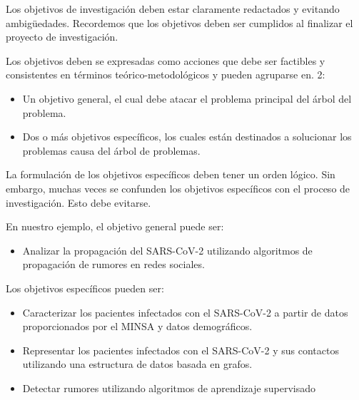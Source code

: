 Los objetivos de investigación deben estar claramente redactados y evitando ambigüedades. Recordemos que los objetivos deben ser cumplidos al finalizar el proyecto de investigación.

Los objetivos deben se expresadas como acciones que debe ser factibles y consistentes en términos teórico-metodológicos y pueden agruparse en. 2:

\begin{itemize}
\item Un objetivo general, el cual debe atacar el problema principal del árbol del problema.
\item Dos o más objetivos específicos, los cuales están destinados a solucionar los problemas causa del árbol de problemas.
\end{itemize}

La formulación de los objetivos específicos deben tener un orden lógico. Sin embargo, muchas veces se confunden los objetivos específicos con el proceso de investigación. Esto debe evitarse.\\

\begin{tcolorbox}[colback=blue!5!white,colframe=blue!75!black,title=Ejemplo]
En nuestro ejemplo, el objetivo general puede ser:

\begin{itemize}
\item Analizar la propagación del SARS-CoV-2 utilizando algoritmos de propagación de rumores en redes sociales.
\end{itemize}

Los objetivos específicos pueden ser:

\begin{itemize}
\item Caracterizar los pacientes infectados con el SARS-CoV-2 a partir de datos proporcionados por el MINSA y datos demográficos.
\item Representar los pacientes infectados con el SARS-CoV-2 y sus contactos utilizando una estructura de datos basada en grafos.
\item Detectar rumores utilizando algoritmos de aprendizaje supervisado
\end{itemize}
\end{tcolorbox}
